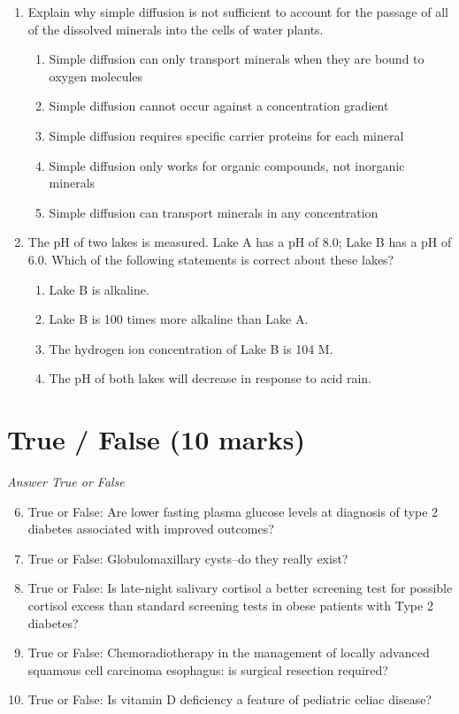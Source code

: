 \documentclass[12pt]{article}
\begin{document}
\begin{enumerate}[label=\arabic*.]
\begin{enumerate}[label=(\alph*)]
\end{enumerate}
\item Explain why simple diffusion is not sufficient to account for the passage of all of the dissolved minerals into the cells of water plants.
\begin{enumerate}[label=(\alph*)]
    \item Simple diffusion can only transport minerals when they are bound to oxygen molecules
    \item Simple diffusion cannot occur against a concentration gradient
    \item Simple diffusion requires specific carrier proteins for each mineral
    \item Simple diffusion only works for organic compounds, not inorganic minerals
    \item Simple diffusion can transport minerals in any concentration
\end{enumerate}
\item The pH of two lakes is measured. Lake A has a pH of 8.0; Lake B has a pH of 6.0. Which of the following statements is correct about these lakes?
\begin{enumerate}[label=(\alph*)]
    \item Lake B is alkaline.
    \item Lake B is 100 times more alkaline than Lake A.
    \item The hydrogen ion concentration of Lake B is 104 M.
    \item The pH of both lakes will decrease in response to acid rain.
\end{enumerate}
\end{enumerate}

\section*{True / False (10 marks)}
\textit{Answer True or False}
\begin{enumerate}[label=\arabic*.]
\setcounter{enumi}{5}
\item True or False: Are lower fasting plasma glucose levels at diagnosis of type 2 diabetes associated with improved outcomes?
\item True or False: Globulomaxillary cysts--do they really exist?
\item True or False: Is late-night salivary cortisol a better screening test for possible cortisol excess than standard screening tests in obese patients with Type 2 diabetes?
\item True or False: Chemoradiotherapy in the management of locally advanced squamous cell carcinoma esophagus: is surgical resection required?
\item True or False: Is vitamin D deficiency a feature of pediatric celiac disease?
\end{enumerate}
\end{document}
